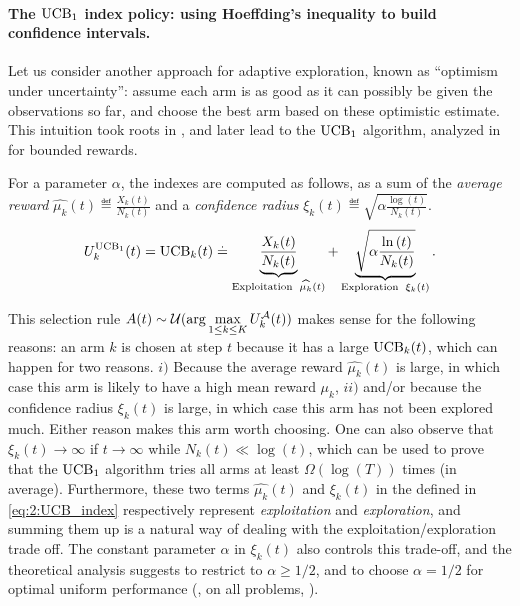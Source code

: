 \paragraph{The $\mathrm{UCB}_1$ index policy: using Hoeffding's inequality to build confidence intervals.}
%
Let us consider another approach for adaptive exploration, known as ``optimism under uncertainty'': assume each arm is as good as it can possibly be given the observations so far, and choose the best arm based on these optimistic estimate.
%
This intuition took roots in \cite{LaiRobbins85}, and later lead to the $\mathrm{UCB}_1$ algorithm, analyzed in \cite{Auer02} for bounded rewards.

For a parameter $\alpha$, the \UCB{} indexes are computed as follows, as a sum of
the \emph{average reward} $\widehat{\mu_k}(t) \eqdef \frac{X_k(t)}{N_k(t)}$
and a \emph{confidence radius} $\xi_k(t) \eqdef \sqrt{\alpha \frac{\log\left(t\right)}{N_k(t)}}$.
%
\begin{align}\label{eq:2:UCB_index}
    U_k^{\mathrm{UCB}_1}(t) = \mathrm{UCB}_k(t) \overset{.}{=} \underbrace{\frac{X_k(t)}{N_k(t)}}_{\text{Exploitation }\; \widehat{\mu_k}(t)} + \underbrace{\sqrt{\alpha \frac{\ln\left(t\right)}{N_k(t)}}}_{\text{Exploration }\; \xi_k(t)}.
\end{align}

This selection rule $A(t) \sim \mathcal{U}(\arg\max\limits_{1\leq k \leq K} U_k^{\mathcal{A}}(t))$ makes sense for the following reasons:
an arm $k$ is chosen at step $t$ because it has a large $\mathrm{UCB}_k(t)$, which can happen for two reasons.
$i)$ Because the average reward $\widehat{\mu_k}(t)$ is large, in which case this arm is likely to have a high mean reward $\mu_k$,
$ii)$ and/or because the confidence radius $\xi_k(t)$ is large, in which case this arm has not been explored much.
Either reason makes this arm worth choosing.
One can also observe that $\xi_k(t)\to\infty$ if $t\to\infty$ while $N_k(t)\ll\log(t)$, which can be used to prove that the $\mathrm{UCB}_1$ algorithm tries all arms at least $\Omega(\log(T))$ times (in average).
%
Furthermore, these two terms $\widehat{\mu_k}(t)$ and $\xi_k(t)$ in the \UCB{} defined in \eqref{eq:2:UCB_index} respectively represent \emph{exploitation} and \emph{exploration}, and summing them up is a natural way of dealing with the exploitation/exploration trade off.
The constant parameter $\alpha$ in $\xi_k(t)$ also controls this trade-off, and the theoretical analysis suggests to restrict to $\alpha\geq1/2$, and to choose $\alpha=1/2$ for optimal uniform performance (\ie, on all problems, \cite{Auer02}).

